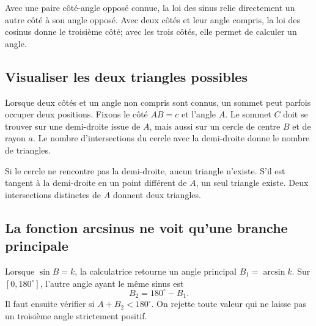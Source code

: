 \begin{connectionbox}
Avec une paire côté-angle opposé connue, la loi des sinus relie directement un autre côté à son angle opposé. Avec deux côtés et leur angle compris, la loi des cosinus donne le troisième côté; avec les trois côtés, elle permet de calculer un angle.
\end{connectionbox}



\subsection{Visualiser les deux triangles possibles}
Lorsque deux côtés et un angle non compris sont connus, un sommet peut parfois occuper deux positions. Fixons le côté $AB=c$ et l'angle $A$. Le sommet $C$ doit se trouver sur une demi-droite issue de $A$, mais aussi sur un cercle de centre $B$ et de rayon $a$. Le nombre d'intersections du cercle avec la demi-droite donne le nombre de triangles.

\begin{center}
\end{center}

Si le cercle ne rencontre pas la demi-droite, aucun triangle n'existe. S'il est tangent à la demi-droite en un point différent de $A$, un seul triangle existe. Deux intersections distinctes de $A$ donnent deux triangles.

\subsection{La fonction arcsinus ne voit qu'une branche principale}
Lorsque $\sin B=k$, la calculatrice retourne un angle principal $B_1=\arcsin k$. Sur $[0,180^\circ]$, l'autre angle ayant le même sinus est
\[
B_2=180^\circ-B_1.
\]
Il faut ensuite vérifier si $A+B_2<180^\circ$. On rejette toute valeur qui ne laisse pas un troisième angle strictement positif.


